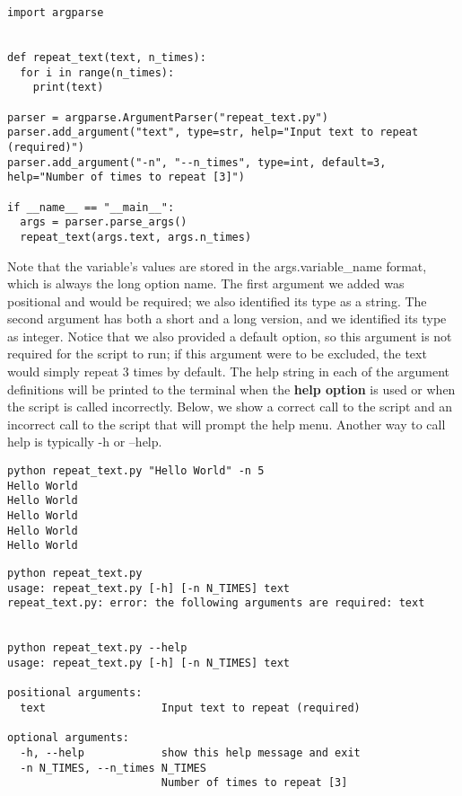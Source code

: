 \documentclass[a4paper,11pt]{article}
\begin{document}
\vspace{3mm}
\begin{lstlisting}
import argparse


def repeat_text(text, n_times):
  for i in range(n_times):
    print(text)

parser = argparse.ArgumentParser("repeat_text.py")
parser.add_argument("text", type=str, help="Input text to repeat (required)")
parser.add_argument("-n", "--n_times", type=int, default=3, help="Number of times to repeat [3]")

if __name__ == "__main__":
  args = parser.parse_args()
  repeat_text(args.text, args.n_times)

\end{lstlisting}
\vspace{3mm}

Note that the variable's values are stored in the args.variable\_name format, which is always the long option name.
The first argument we added was positional and would be required; we also identified its type as a string.  
The second argument has both a short and a long version, and we identified its type as integer.  Notice 
that we also provided a default option, so this argument is not required for the script to run; if this 
argument were to be excluded, the text would simply repeat 3 times by default.  The help string in each 
of the argument definitions will be printed to the terminal when the \textbf{help option} is used or 
when the script is called incorrectly.  Below, we show a correct call to the script and an incorrect 
call to the script that will prompt the help menu.  Another way to call help is typically -h or --help.

\vspace{3mm}
\begin{lstlisting}
python repeat_text.py "Hello World" -n 5
Hello World
Hello World
Hello World
Hello World
Hello World
\end{lstlisting}
\vspace{3mm}

\vspace{3mm}
\begin{lstlisting}
python repeat_text.py 
usage: repeat_text.py [-h] [-n N_TIMES] text
repeat_text.py: error: the following arguments are required: text


python repeat_text.py --help
usage: repeat_text.py [-h] [-n N_TIMES] text

positional arguments:
  text                  Input text to repeat (required)

optional arguments:
  -h, --help            show this help message and exit
  -n N_TIMES, --n_times N_TIMES
                        Number of times to repeat [3]
\end{lstlisting}
\vspace{3mm}
\end{document}

